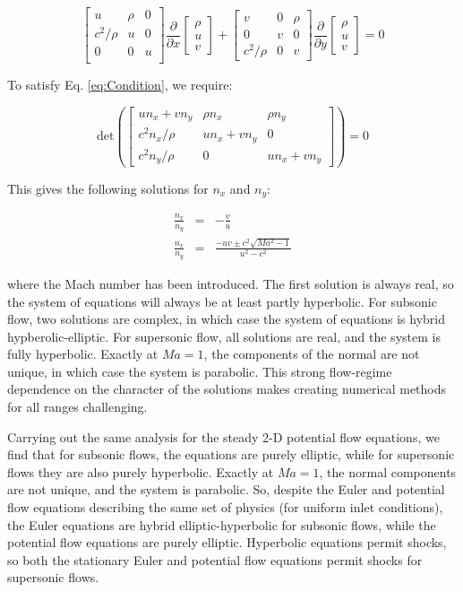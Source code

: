 \documentclass[10pt]{article}
\newcommand{\beq}{\begin{equation}}
\newcommand{\eeq}{\end{equation}}
\begin{document}
\begin{flushleft}
\beq
\begin{bmatrix}
u & \rho & 0\\
c^2/\rho & u & 0\\
0 & 0 & u\\
\end{bmatrix}
\frac{\partial}{\partial x}\begin{bmatrix}\rho \\ u \\ v\end{bmatrix}+
\begin{bmatrix}
v & 0 & \rho\\
0 & v & 0\\
c^2/\rho & 0 & v
\end{bmatrix}
\frac{\partial}{\partial y}\begin{bmatrix}\rho \\ u \\ v\end{bmatrix}=0
\eeq

To satisfy Eq. \eqref{eq:Condition}, we require:

\beq
\text{det}\left(\begin{bmatrix}
un_x+vn_y & \rho n_x & \rho n_y\\
c^2n_x/\rho & un_x+vn_y & 0\\
c^2n_y/\rho & 0 & un_x+vn_y
\end{bmatrix}\right)=0
\eeq

This gives the following solutions for \(n_x\) and \(n_y\):

\begin{subequations}
\begin{eqnarray}
\frac{n_x}{n_y}&=&-\frac{v}{u}\\
\frac{n_x}{n_y}&=&\frac{-uv\pm c^2\sqrt{Ma^2-1}}{u^2-c^2}
\end{eqnarray}
\end{subequations}

where the Mach number has been introduced. The first solution is always real, so the system of equations will always be at least partly hyperbolic. For subsonic flow, two solutions are complex, in which case the system of equations is hybrid hypberolic-elliptic. For supersonic flow, all solutions are real, and the system is fully hyperbolic. Exactly at \(Ma=1\), the components of the normal are not unique, in which case the system is parabolic. This strong flow-regime dependence on the character of the solutions makes creating numerical methods for all ranges challenging. 

Carrying out the same analysis for the steady 2-D potential flow equations, we find that for subsonic flows, the equations are purely elliptic, while for supersonic flows they are also purely hyperbolic. Exactly at \(Ma=1\), the normal components are not unique, and the system is parabolic. So, despite the Euler and potential flow equations describing the same set of physics (for uniform inlet conditions), the Euler equations are hybrid elliptic-hyperbolic for subsonic flows, while the potential flow equations are purely elliptic. Hyperbolic equations permit shocks, so both the stationary Euler and potential flow equations permit shocks for supersonic flows.


\end{flushleft}
\end{document}
